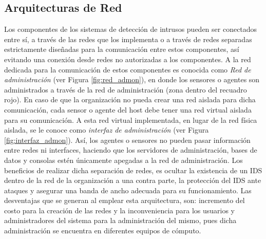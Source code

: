 \subsection{Arquitecturas de Red}

Los componentes de los sistemas de detección de intrusos pueden ser conectados entre sí, a través de las redes que los implementa o a través de redes separadas estrictamente diseñadas para la comunicación entre estos componentes, así evitando una conexión desde redes no autorizadas a los componentes. A la red dedicada para la comunicación de estos componentes es conocida como \textit{Red de administración} (ver Figura \ref{fig:red_admon}), en donde los sensores o agentes son administrados a través de la red de administración (zona dentro del recuadro rojo). En caso de que la organización no pueda crear una red aislada para dicha comunicación, cada sensor o agente del host debe tener una red virtual aislada para su comunicación. A esta red virtual implementada, en lugar de la red física aislada, se le conoce como \textit{interfaz de administración} (ver Figura \ref{fig:interfaz_admon}). Así, los agentes o sensores no pueden pasar información entre redes ni interfaces, haciendo que los servidores de administración, bases de datos y consolas estén únicamente apegadas a la red de administración. Los beneficios de realizar dicha separación de redes, es ocultar la existencia de un IDS dentro de la red de la organización a una contra parte, la protección del IDS ante ataques y asegurar una banda de ancho adecuada para su funcionamiento. Las desventajas que se generan al emplear esta arquitectura, son: incremento del costo para la creación de las redes y la inconveniencia para los usuarios y administradores del sistema para la administración del mismo, pues dicha administración se encuentra en diferentes equipos de cómputo.\\
	
